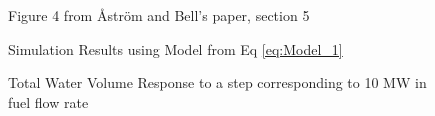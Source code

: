         \begin{figure}[ht]
            \begin{center}
                
                Figure 4 from \r{A}str\"{o}m and Bell's paper, section 5 \cite{Astrom}    
                
                
                Simulation Results using Model from Eq \eqref{eq:Model_1}
                
                \caption{Total Water Volume Response to a step corresponding to 10 MW in fuel flow rate}
                \label{fig:Fig4A}
            \end{center}
        \end{figure}
